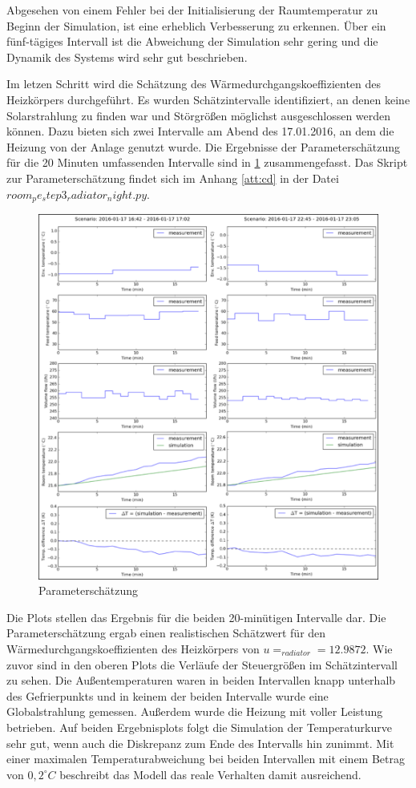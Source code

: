 Abgesehen von einem Fehler bei der Initialisierung der Raumtemperatur zu Beginn der Simulation, ist eine erheblich Verbesserung zu erkennen. Über ein fünf-tägiges Intervall ist die Abweichung der Simulation sehr gering und die Dynamik des Systems wird sehr gut beschrieben.

Im letzen Schritt wird die Schätzung des Wärmedurchgangskoeffizienten des Heizkörpers durchgeführt. Es wurden Schätzintervalle identifiziert, an denen keine Solarstrahlung zu finden war und Störgrößen möglichst ausgeschlossen werden können. Dazu bieten sich zwei Intervalle am Abend des 17.01.2016, an dem die Heizung von der Anlage genutzt wurde. Die Ergebnisse der Parameterschätzung für die 20 Minuten umfassenden Intervalle sind in \ref{fig:step3} zusammengefasst. Das Skript zur Parameterschätzung findet sich im Anhang \ref{att:cd} in der Datei $room_pe_step3_radiator_night.py$.

\begin{figure}
\centering
\includegraphics[width=\textwidth]{abbildungen/20160329_pestep3}
\caption{Parameterschätzung}
\label{fig:step3}
\end{figure}

Die Plots stellen das Ergebnis für die beiden 20-minütigen Intervalle dar. Die Parameterschätzung ergab einen realistischen Schätzwert für den Wärmedurchgangskoeffizienten des Heizkörpers von $u=_{radiator}=12.9872$.
Wie zuvor sind in den oberen Plots die Verläufe der Steuergrößen im Schätzintervall zu sehen. Die Außentemperaturen waren in beiden Intervallen knapp unterhalb des Gefrierpunkts und in keinem der beiden Intervalle wurde eine Globalstrahlung gemessen. Außerdem wurde die Heizung mit voller Leistung betrieben.
Auf beiden Ergebnisplots folgt die Simulation der Temperaturkurve sehr gut, wenn auch die Diskrepanz zum Ende des Intervalls hin zunimmt. Mit einer maximalen Temperaturabweichung bei beiden Intervallen mit einem Betrag von $0,2^{\circ}C$ beschreibt das Modell das reale Verhalten damit ausreichend.

